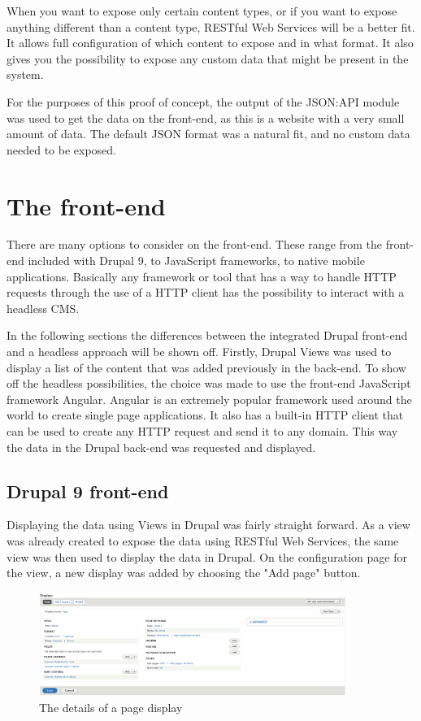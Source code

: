 When you want to expose only certain content types, or if you want to expose anything different than a content type, RESTful Web Services will be a better fit. It allows full configuration of which content to expose and in what format. It also gives you the possibility to expose any custom data that might be present in the system.

For the purposes of this proof of concept, the output of the JSON:API module was used to get the data on the front-end, as this is a website with a very small amount of data. The default JSON format was a natural fit, and no custom data needed to be exposed. 

\section{The front-end}

There are many options to consider on the front-end. These range from the front-end included with Drupal 9, to JavaScript frameworks, to native mobile applications. Basically any framework or tool that has a way to handle HTTP requests through the use of a HTTP client has the possibility to interact with a headless CMS. 

In the following sections the differences between the integrated Drupal front-end and a headless approach will be shown off. Firstly, Drupal Views was used to display a list of the content that was added previously in the back-end. To show off the headless possibilities, the choice was made to use the front-end JavaScript framework Angular. Angular is an extremely popular framework used around the world to create single page applications. It also has a built-in HTTP client that can be used to create any HTTP request and send it to any domain. This way the data in the Drupal back-end was requested and displayed.

\subsection{Drupal 9 front-end}

Displaying the data using Views in Drupal was fairly straight forward. As a view was already created to expose the data using RESTful Web Services, the same view was then used to display the data in Drupal. On the configuration page for the view, a new display was added by choosing the "Add page" button. 

\begin{figure}[h]
	\centering
	\includegraphics[width=10cm]{./img/Page_View_Config.png}
	\caption[Details of a page display]{The details of a page display}
\end{figure}

